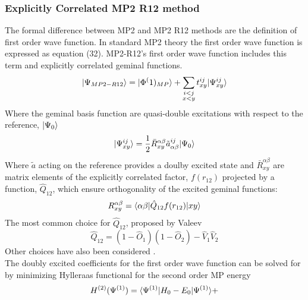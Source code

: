     \subsubsection{Explicitly Correlated MP2 R12 method}
      The formal difference between MP2 and MP2 R12 methods are the definition of first order wave function.  In standard MP2 theory the first order wave function is expressed as equation (32).  MP2-R12's first order wave function includes this term and explicitly correlated geminal functions.
        \begin{equation}
          | \Psi_{MP2-R12} \rangle = | \Phi^(1)_{MP} \rangle + \sum_{\substack{i<j \\ x<y}} t^{ij}_{xy} | \Psi^{ij}_{xy} \rangle
        \end{equation}
      Where the geminal basis function are quasi-double excitations with respect to the reference, $| \Psi_0 \rangle$
        \begin{equation}
        | \Psi^{ij}_{xy} \rangle = \frac{1}{2} \bar{R}^{\alpha \beta}_{xy} \tilde{a}^{ij}_{\alpha \beta} | \Psi_0 \rangle
        \end{equation}
      Where $\tilde{a}$ acting on the reference provides a doulby excited state and $\bar{R}^{\alpha\beta}_{xy}$ are matrix elements of the explicitly correlated factor, $f(r_{12})$ projected by a function, $\hat{Q}_{12}$, which ensure orthogonality of the excited geminal functions:
        \begin{equation}
          R^{\alpha \beta}_{xy} = \langle\alpha \beta | \hat{Q}_{12} f(r_{12})| xy \rangle
        \end{equation}
      The most common choice for $\hat{Q}_{12}$, proposed by Valeev\cite{Valeev 2004} 
        \begin{equation}
          \hat{Q}_{12} = (1-\hat{O}_1)(1-\hat{O}_2)- \hat{V}_1 \hat{V}_2
        \end{equation}
      Other choices have also been considered \cite{wind 2002, Koppler 2002}.\\
      The doubly excited coefficients for the first order wave function can be solved for by minimizing Hylleraas functional for the second order MP energy 
        \begin{equation}
          H^{(2)} (\Psi^{(1)}) = \langle\Psi^{(1)} | H_0 - E_0 | \Psi^{(1)} \rangle + 
        \end{equation}
